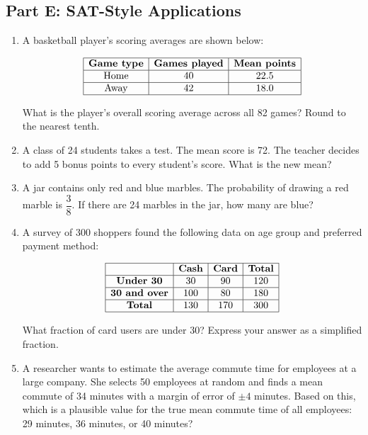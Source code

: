 \documentclass[14pt]{extarticle}
\begin{document}
\subsection*{Part E: SAT-Style Applications}
\begin{enumerate}
  \item A basketball player's scoring averages are shown below:

  \[
  \begin{array}{|c|c|c|}
  \hline
  \textbf{Game type} & \textbf{Games played} & \textbf{Mean points} \\
  \hline
  \text{Home} & 40 & 22.5 \\
  \hline
  \text{Away} & 42 & 18.0 \\
  \hline
  \end{array}
  \]

  What is the player's overall scoring average across all 82 games? Round to the nearest tenth.

  \item A class of 24 students takes a test. The mean score is 72. The teacher decides to add 5 bonus points to every student's score. What is the new mean?

  \item A jar contains only red and blue marbles. The probability of drawing a red marble is \(\dfrac{3}{8}\). If there are 24 marbles in the jar, how many are blue?

  \item A survey of 300 shoppers found the following data on age group and preferred payment method:

  \[
  \begin{array}{|c|c|c|c|}
  \hline
   & \textbf{Cash} & \textbf{Card} & \textbf{Total} \\
  \hline
  \textbf{Under 30} & 30 & 90 & 120 \\
  \hline
  \textbf{30 and over} & 100 & 80 & 180 \\
  \hline
  \textbf{Total} & 130 & 170 & 300 \\
  \hline
  \end{array}
  \]

  What fraction of card users are under 30? Express your answer as a simplified fraction.

  \item A researcher wants to estimate the average commute time for employees at a large company. She selects 50 employees at random and finds a mean commute of 34 minutes with a margin of error of \(\pm 4\) minutes. Based on this, which is a plausible value for the true mean commute time of all employees: 29 minutes, 36 minutes, or 40 minutes?
\end{enumerate}
\end{document}
